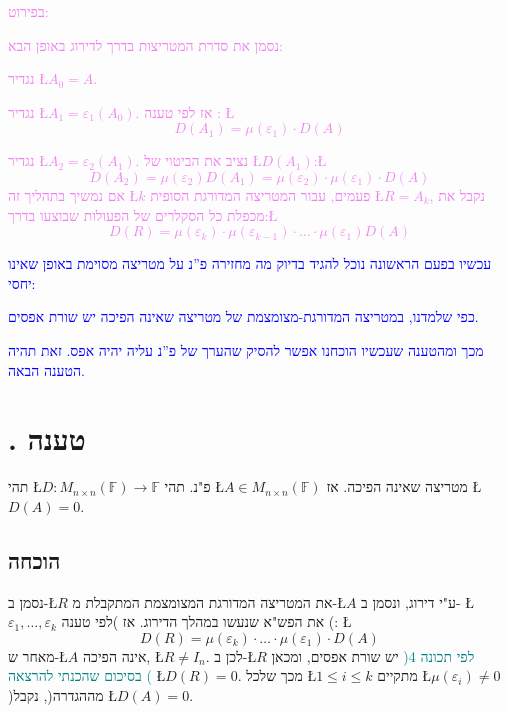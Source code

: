 \documentclass[english,hebrew]{article}
\begin{document}
\medskip{}
\textcolor{violet}{בפירוט:}

\textcolor{violet}{נסמן את סדרת המטריצות בדרך לדירוג באופן הבא: }

\textcolor{violet}{נגדיר \L{$A_{0}=A$}.}

\textcolor{violet}{נגדיר \L{$A_{1}=\varepsilon_{1}(A_{0})$}. אז לפי
טענה }\textcolor{violet}{{}\endL}\textcolor{violet}{: \L{%
\[
D(A_{1})=\mu(\varepsilon_{1})\cdot D(A)
\]
}%
}

\textcolor{violet}{נגדיר \L{$A_{2}=\varepsilon_{2}(A_{1})$}. נציב
את הביטוי של \L{$D(A_{1})$}:\L{%
\[
D(A_{2})=\mu(\varepsilon_{2})D(A_{1})=\mu(\varepsilon_{2})\cdot\mu(\varepsilon_{1})\cdot D(A)
\]
}%
אם נמשיך בתהליך זה \L{$k$} פעמים, עבור המטריצה המדורגת הסופית \L{$R=A_{k}$},
נקבל את מכפלת כל הסקלרים של הפעולות שבוצעו בדרך:\L{%
\[
D(R)=\mu(\varepsilon_{k})\cdot\mu(\varepsilon_{k-1})\cdot\dots\cdot\mu(\varepsilon_{1})D(A)
\]
}%
}\medskip{}

\textcolor{blue}{עכשיו בפעם הראשונה נוכל להגיד בדיוק מה מחזירה פ\textquotedblright נ
על מטריצה מסוימת באופן שאינו יחסי:}

\textcolor{blue}{כפי שלמדנו, במטריצה המדורגת-מצומצמת של מטריצה שאינה
הפיכה יש שורת אפסים.}

\textcolor{blue}{מכך ומהטענה שעכשיו הוכחנו אפשר להסיק שהערך של פ\textquotedblright נ
עליה יהיה אפס. זאת תהיה הטענה הבאה.}

\medskip{}

\section{{\endL}. טענה}

תהי \L{$D:M_{n\times n}(\mathbb{F})\to\mathbb{F}$} פ"נ. תהי \L{$A\in M_{n\times n}(\mathbb{F})$}
מטריצה שאינה הפיכה. אז \L{$D(A)=0$}.

\subsection{הוכחה}

נסמן ב-\L{$R$} את המטריצה המדורגת המצומצמת המתקבלת מ-\L{$A$} ע"י
דירוג, ונסמן ב- \L{$\varepsilon_{1},\dots,\varepsilon_{k}$} את הפש"א
שנעשו במהלך הדירוג. אז )לפי טענה {\endL}(: \L{%
\[
D(R)=\mu(\varepsilon_{k})\cdot\dots\cdot\mu(\varepsilon_{1})\cdot D(A)
\]
}%
מאחר ש-\L{$A$} אינה הפיכה, \L{$R\neq I_{n}$}. לכן ב-\L{$R$} יש
שורת אפסים, ומכאן \textcolor{teal}{)לפי תכונה 4 בסיכום שהכנתי להרצאה
}\textcolor{teal}{{}\endL}\textcolor{teal}{(} \L{$D(R)=0$}.
מכך שלכל \L{$1\le i\le k$} מתקיים \L{$\mu(\varepsilon_{i})\neq0$}
)מההגדרה(, נקבל \L{$D(A)=0$}.\\
\end{document}

